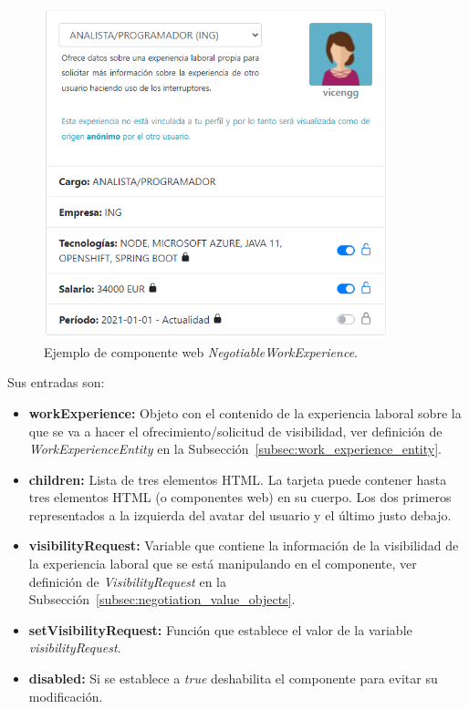 \documentclass[a4paper, 12pt]{book}
\begin{document}
    \begin{figure}
        \centering
        \includegraphics[width=10cm, keepaspectratio]{img/NegotiableWorkExperience.PNG}
        \caption{Ejemplo de componente web \emph{NegotiableWorkExperience}.}\label{fig:component_negotiable_work_experience}
    \end{figure}

    Sus entradas son:

    \begin{itemize}
        \item \textbf{workExperience:} Objeto con el contenido de la experiencia laboral sobre la que se va a hacer el ofrecimiento/solicitud de visibilidad, ver definición de \emph{WorkExperienceEntity} en la Subsección~\ref{subsec:work_experience_entity}.
        \item \textbf{children:} Lista de tres elementos HTML. La tarjeta puede contener hasta tres elementos HTML (o componentes web) en su cuerpo. Los dos primeros representados a la izquierda del avatar del usuario y el último justo debajo.
        \item \textbf{visibilityRequest:} Variable que contiene la información de la visibilidad de la experiencia laboral que se está manipulando en el componente, ver definición de \emph{VisibilityRequest} en la Subsección~\ref{subsec:negotiation_value_objects}.
        \item \textbf{setVisibilityRequest:} Función que establece el valor de la variable \emph{visibilityRequest}.
        \item \textbf{disabled:} Si se establece a \emph{true} deshabilita el componente para evitar su modificación.
    \end{itemize}
\end{document}
